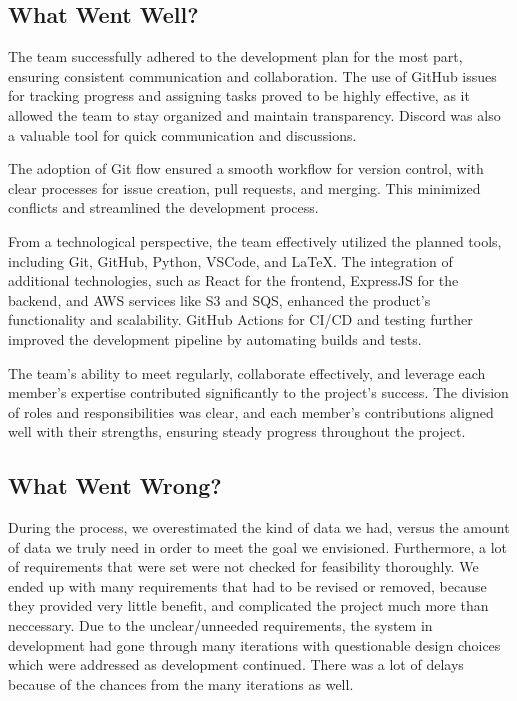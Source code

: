 \documentclass{article}
\begin{document}
\subsection{What Went Well?}

The team successfully adhered to the development plan for the most part, ensuring consistent communication and collaboration. The use of GitHub issues for tracking progress and assigning tasks proved to be highly effective, as it allowed the team to stay organized and maintain transparency. Discord was also a valuable tool for quick communication and discussions.

The adoption of Git flow ensured a smooth workflow for version control, with clear processes for issue creation, pull requests, and merging. This minimized conflicts and streamlined the development process.

From a technological perspective, the team effectively utilized the planned tools, including Git, GitHub, Python, VSCode, and LaTeX. The integration of additional technologies, such as React for the frontend, ExpressJS for the backend, and AWS services like S3 and SQS, enhanced the product's functionality and scalability. GitHub Actions for CI/CD and testing further improved the development pipeline by automating builds and tests.

The team's ability to meet regularly, collaborate effectively, and leverage each member's expertise contributed significantly to the project's success. The division of roles and responsibilities was clear, and each member's contributions aligned well with their strengths, ensuring steady progress throughout the project.

\subsection{What Went Wrong?}

During the process, we overestimated the kind of data we had, versus the amount
of data we truly need in order to meet the goal we envisioned. Furthermore, a
lot of requirements that were set were not checked for feasibility thoroughly.
We ended up with many requirements that had to be revised or removed, because
they provided very little benefit, and complicated the project much more than
neccessary. Due to the unclear/unneeded requirements, the system in development
had gone through many iterations with questionable design choices which were
addressed as development continued. There was a lot of delays because of the
chances from the many iterations as well. 
\end{document}
